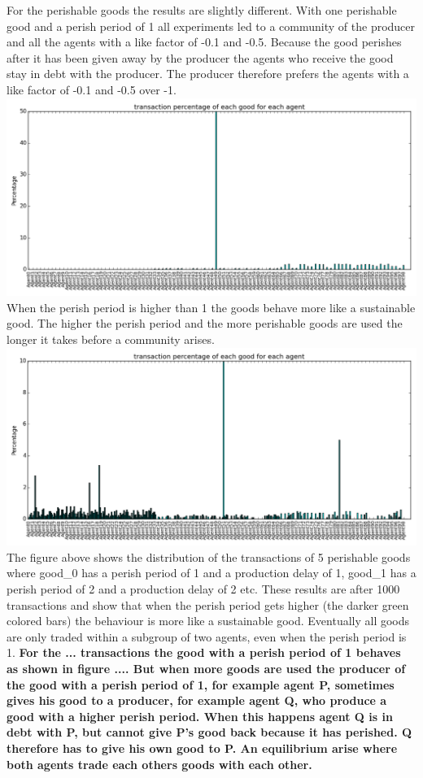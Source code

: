 \documentclass[twoside,openright]{uva-bachelor-thesis}
\begin{document}
For the perishable goods the results are slightly different. With one perishable good and a perish period of 1 all experiments led to a community of the producer and all the agents with a like factor of -0.1 and -0.5. Because the good perishes after it has been given away by the producer the agents who receive the good stay in debt with the producer. The producer therefore prefers the agents with a like factor of -0.1 and -0.5 over -1. \\
\includegraphics[scale=0.4]{GR_L1B2N1/1000transactions1perishable1-1} \\
When the perish period is higher than 1 the goods behave more like a sustainable good. The higher the perish period and the more perishable goods are used the longer it takes before a community arises.\\
\includegraphics[scale=0.4]{GR_L1B2N1/1000transactions5perishable} \\
The figure above shows the distribution of the transactions of 5 perishable goods where good\_0 has a perish period of 1 and a production delay of 1, good\_1 has a perish period of 2 and a production delay of 2 etc. These results are after 1000 transactions and show that when the perish period gets higher (the darker green colored bars) the behaviour is more like a sustainable good. Eventually all goods are only traded within a subgroup of two agents, even when the perish period is 1.\textbf{ For the ... transactions the good with a perish period of 1 behaves as shown in figure .... But when more goods are used the producer of the good with a perish period of 1, for example agent P, sometimes gives his good to a producer, for example agent Q, who produce a good with a higher perish period. When this happens agent Q is in debt with P, but cannot give P's good back because it has perished. Q therefore has to give his own good to P. An equilibrium arise where both agents trade each others goods with each other.}\\
\end{document}
